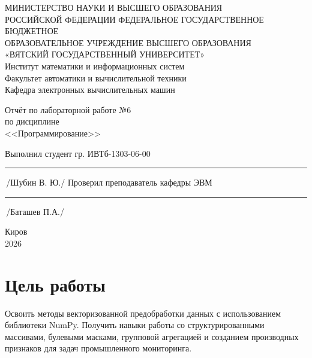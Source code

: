\documentclass[oneside,a4paper,14pt]{extarticle}
\begin{document}
\newpage
\thispagestyle{empty}
\begin{center}
	МИНИСТЕРСТВО НАУКИ И ВЫСШЕГО ОБРАЗОВАНИЯ\\
	РОССИЙСКОЙ ФЕДЕРАЦИИ
	ФЕДЕРАЛЬНОЕ ГОСУДАРСТВЕННОЕ БЮДЖЕТНОЕ\\
	ОБРАЗОВАТЕЛЬНОЕ
	УЧРЕЖДЕНИЕ ВЫСШЕГО ОБРАЗОВАНИЯ\\
	«ВЯТСКИЙ ГОСУДАРСТВЕННЫЙ УНИВЕРСИТЕТ»\\
	Институт математики и информационных систем\\
	Факультет автоматики и вычислительной техники\\
	Кафедра электронных вычислительных машин
\end{center}

\vspace{20mm}

\begin{center}
	Отчёт по лабораторной работе №6\\
	по дисциплине\\
	<<Программирование>>
\end{center}

\vspace{48mm}

\noindent
Выполнил студент гр. ИВТб-1303-06-00 \hfill \rule[-0,5mm]{30mm}{0.15mm}\,/Шубин В. Ю./
\newline
Проверил преподаватель кафедры ЭВМ \hfill \rule[-0,5mm]{30mm}{0.15mm}\,/Баташев П.А./

\vfill

\begin{center}
	Киров\\
	2026
\end{center}

\newpage
\thispagestyle{empty}

\section*{Цель работы}
Освоить методы векторизованной предобработки данных с использованием библиотеки NumPy. Получить навыки работы со структурированными массивами, булевыми масками, групповой агрегацией и созданием производных признаков для задач промышленного мониторинга.
\end{document}
